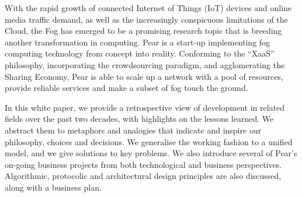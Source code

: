 With the rapid growth of connected Internet of Things (IoT) devices and online media traffic demand, as well as the increasingly conspicuous limitations of the Cloud, the Fog has emerged to be a promising research topic that is breeding another transformation in computing. Pear is a start-up implementing fog computing technology from concept into reality. Conforming to the ``XaaS'' philosophy, incorporating the crowdsourcing paradigm, and agglomerating the Sharing Economy, Pear is able to scale up a network with a pool of resources, provide reliable services and make a subset of fog touch the ground. 

In this white paper, we provide a retrospective view of development in related fields over the past two decades, with highlights on the lessons learned. We abstract them to metaphors and analogies that indicate and inspire our philosophy, choices and decisions. We generalise the working fashion to a unified model, and we give solutions to key problems. We also introduce several of Pear's on-going business projects from both technological and business perspectives. Algorithmic, protocolic and architectural design principles are also discussed, along with a business plan.   

